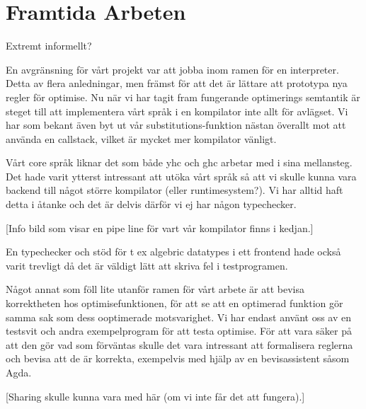 \documentclass[Rapport]{subfiles}
\begin{document}
\section{Framtida Arbeten}

Extremt informellt?

En avgränsning för vårt projekt var att jobba inom ramen för en interpreter. 
Detta av flera anledningar, men främst för att det är lättare att prototypa nya 
regler för optimise. Nu när vi har tagit fram fungerande optimerings semtantik 
är steget till att implementera vårt språk i en kompilator inte allt för 
avlägset. 
Vi har som bekant även byt ut vår substitutions-funktion nästan överallt mot att
använda en callstack, vilket är mycket mer kompilator vänligt. 


Vårt core språk liknar det som både yhc och ghc arbetar med i sina mellansteg.
Det hade varit ytterst intressant att utöka vårt språk så att vi skulle kunna 
vara backend till något större kompilator (eller runtimesystem?). 
Vi har alltid haft detta i åtanke och det är delvis därför vi ej har någon 
typechecker.

[Info bild som visar en pipe line för vart vår kompilator finns i kedjan.]

En typechecker och stöd för t ex algebric datatypes i ett frontend hade också
varit trevligt då det är väldigt lätt att skriva fel i testprogramen. 


Något annat som föll lite utanför ramen för vårt arbete är att bevisa
korrektheten hos optimisefunktionen, för att se att en optimerad funktion
gör samma sak som dess ooptimerade motsvarighet. Vi har endast använt oss av en testsvit
och andra exempelprogram för att testa optimise. För att vara säker på att den
gör vad som förväntas skulle det vara intressant att formalisera reglerna och bevisa
att de är korrekta, exempelvis med hjälp av en bevisassistent såsom Agda.

[Sharing skulle kunna vara med här (om vi inte får det att fungera).]
\end{document}
